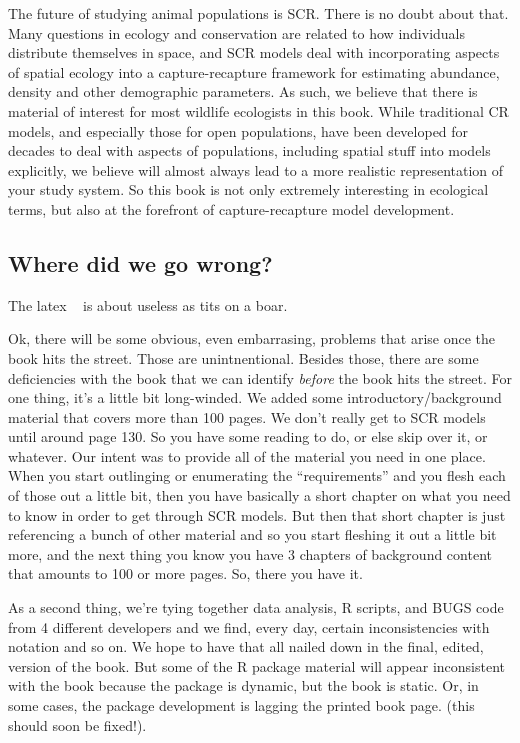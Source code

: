 The future of studying animal populations is SCR. There is no doubt
about that. Many questions in ecology and conservation are related to how individuals distribute themselves in space, and SCR models deal with incorporating aspects of spatial ecology into a capture-recapture framework for estimating abundance, density and other demographic parameters. As such, we believe that there is material of interest for most wildlife ecologists in this book. While traditional CR models, and especially those for open populations, have been developed for decades to deal with aspects of populations, including spatial stuff into models explicitly, we believe will almost always lead to a more realistic representation of your study system.  So this book is not only extremely interesting in ecological terms, but also at the forefront of capture-recapture model development.

\subsection*{Where did we go wrong?}

The latex ~ is about useless as tits on a boar.

Ok, there will be some obvious, even embarrasing, problems that arise
once the book hits the street. Those are unintnentional. Besides
those, there are some deficiencies with the book that we can identify
{\it before} the book hits the street. For one thing, it's a little
bit long-winded. We added some introductory/background material that
covers more than 100 pages. We don't really get to SCR models until
around page 130.  So you have some reading to do, or else skip over
it, or whatever. Our intent was to provide all of the material you
need in one place. When you start outlinging or enumerating the
``requirements'' and you flesh each of those out a little bit, then
you have basically a short chapter on what you need to know in order
to get through SCR models. But then that short chapter is just
referencing a bunch of other material and so you start fleshing it out
a little bit more, and the next thing you know you have 3 chapters of
background content that amounts to 100 or more pages.  So, there you
have it.  

As a second thing, we're tying together data analysis, R scripts, and
BUGS code from 4 different developers and we find, every day, certain
inconsistencies with notation and so on. We hope to have that all
nailed down in the final, edited, version of the book. But some of the
R package material will appear inconsistent with the book because the
package is dynamic, but the book is static. Or, in some cases, the
package development is lagging the printed book page. (this should
soon be fixed!). 






